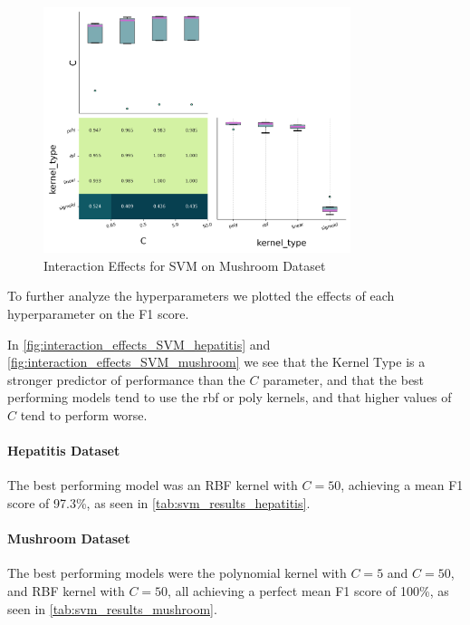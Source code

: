 \begin{figure}
    \centering
    \includegraphics[width=0.8\textwidth]{figures/interaction_effects_SVM_mushroom.png}
    \caption{Interaction Effects for SVM on Mushroom Dataset}
    \label{fig:interaction_effects_SVM_mushroom}
\end{figure}

To further analyze the hyperparameters we plotted the effects of each hyperparameter on the F1 score.

In \autoref{fig:interaction_effects_SVM_hepatitis} and \autoref{fig:interaction_effects_SVM_mushroom} we see that the Kernel Type is a stronger predictor of performance than the $C$ parameter, and that
the best performing models tend to use the rbf or poly kernels, and that higher values of $C$ tend to perform worse.

\paragraph{Hepatitis Dataset}
The best performing model was an RBF kernel with $C=50$, achieving a mean F1 score of 97.3\%, as seen in \autoref{tab:svm_results_hepatitis}.

\paragraph{Mushroom Dataset}
The best performing models were the polynomial kernel with $C=5$ and $C=50$, and RBF kernel with $C=50$, all achieving a perfect mean F1 score of 100\%, as seen in \autoref{tab:svm_results_mushroom}.

